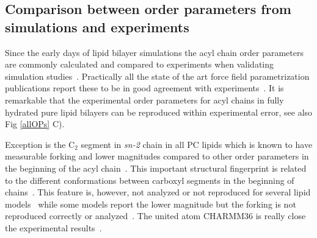\documentclass[aps,prl,superscriptaddress,twocolumn]{revtex4}
\begin{document}
\subsection{Comparison between order parameters from simulations and experiments}

Since the early days of lipid bilayer simulations the acyl chain order parameters are commonly calculated and compared to experiments
when validating simulation studies~\cite{ploeg82,egberts88,stouch93,egberts94,essex94,robinson94,hyvonen95,kothekar96,tieleman96,shinoda97,berger97,tieleman97,klauda08b}. 
Practically all the state of the art force field parametrization publications report these
to be in good agreement with experiments~\cite{berger97,hogberg08,poger10,ulmschneider09,kukol09,chiu09,klauda10,dickson12,jambeck12,chowdhary13,maciejewski14,tjornhammar14,dickson14,lee14}.
It is remarkable that the experimental order parameters for acyl chains in fully hydrated pure lipid bilayers
can be reproduced within experimental error, see also Fig \ref{allOPs} C). 

Exception is the C$_2$ segment in {\it sn-2} chain in all PC lipids which is known
to have measurable forking and lower magnitudes compared to other order parameters in 
the beginning of the acyl chain~\cite{seelig74,seelig75,gross97,dvinskikh05a,ferreira13}. This important structural fingerprint is
related to the different conformations between carboxyl segments in the beginning of chains~\cite{schindler75}.
This feature is, however, not analyzed or not reproduced for several lipid models~\cite{hogberg08,siu08,chiu09,kukol09,ulmschneider09,jambeck12,dickson12,chowdhary13,tjornhammar14,maciejewski14}
while some models report the lower magnitude but the forking is not reproduced correctly or analyzed~\cite{siu08,klauda10,chowdhary13,dickson14}.
The united atom CHARMM36 is really close the experimental results~\cite{lee14}.
\end{document}
